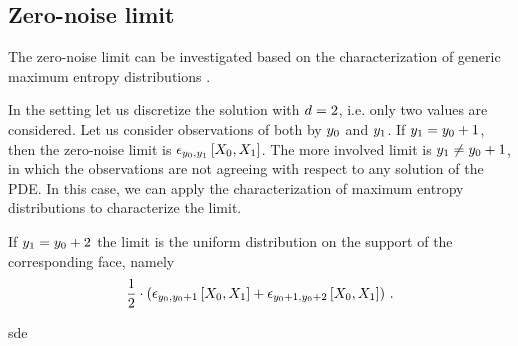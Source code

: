 \documentclass[aps,onecolumn,nofootinbib,pra]{article}
\begin{document}
    \subsection{Zero-noise limit}

    The zero-noise limit can be investigated based on the characterization of generic maximum entropy distributions \cite{goessmann_tensor_2026-1}.

    \begin{example}
        In the setting  let us discretize the solution with $d=2$, i.e. only two values are considered.
        Let us consider observations of both by $y_{0}$ and $y_{1}$.
        If $y_{1}=y_{0}+1$, then the zero-noise limit is $\epsilon_{y_{0},y_{1}}\left[X_{0},X_{1}\right]$.
        The more involved limit is $y_{1}\neq y_{0}+1$, in which the observations are not agreeing with respect to any solution of the PDE.
        In this case, we can apply the characterization of maximum entropy distributions \cite{goessmann_tensor_2026-1} to characterize the limit.

        If $y_{1}=y_{0}+2$ the limit is the uniform distribution on the support of the corresponding face, namely
        \begin{align*}
            \frac{1}{2} \cdot \left(
            \epsilon_{y_{0},y_{0}+1}\left[X_{0},X_{1}\right]
            + \epsilon_{y_{0}+1,y_{0}+2}\left[X_{0},X_{1}\right]
            \right) \, .
        \end{align*}
    \end{example}


    {sde}

    
    
\end{document}

